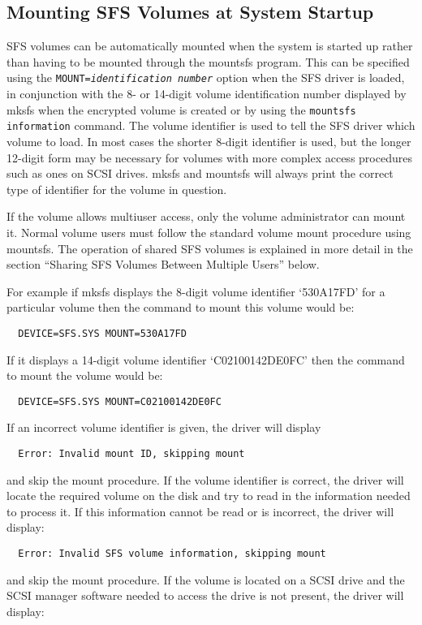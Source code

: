 \subsection{Mounting SFS Volumes at System Startup}

SFS volumes can be automatically mounted when the system is started up rather
than having to be mounted through the mountsfs program.  This can be specified
using the {\tt MOUNT={\em identification number}} option when the SFS driver is loaded, 
in conjunction with the 8- or 14-digit volume identification number displayed 
by mksfs when the encrypted volume is created or by using the {\tt mountsfs 
information} command.  The volume identifier is used to tell the SFS driver 
which volume to load.   In most cases the shorter 8-digit identifier is used, 
but the longer 12-digit form may be necessary for volumes with more complex 
access procedures such as ones on SCSI drives.  mksfs and mountsfs will always 
print the correct type of identifier for the volume in question.

If the volume allows multiuser access, only the volume administrator can mount 
it.  Normal volume users must follow the standard volume mount procedure using 
mountsfs.  The operation of shared SFS volumes is explained in more detail in 
the section ``Sharing SFS Volumes Between Multiple Users'' below.

For example if mksfs displays the 8-digit volume identifier `530A17FD' for a 
particular volume then the command to mount this volume would be:

{\tt \verb|  |DEVICE=SFS.SYS MOUNT=530A17FD}

If it displays a 14-digit volume identifier `C02100142DE0FC' then the command
to mount the volume would be:

{\tt \verb|  |DEVICE=SFS.SYS MOUNT=C02100142DE0FC}

If an incorrect volume identifier is given, the driver will display

{\tt \verb|  |Error: Invalid mount ID, skipping mount}

and skip the mount procedure.  If the volume identifier is correct, the driver 
will locate the required volume on the disk and try to read in the information 
needed to process it.  If this information cannot be read or is incorrect, the 
driver will display:

{\tt \verb|  |Error: Invalid SFS volume information, skipping mount}

and skip the mount procedure.  If the volume is located on a SCSI drive and the 
SCSI manager software needed to access the drive is not present, the driver
will display:

